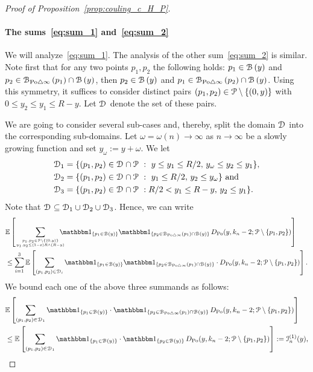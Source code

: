 \begin{proof}[Proof of Proposition~\ref{prop:couling_c_H_P}]
\paragraph{The sums~\eqref{eq:sum_1} and~\eqref{eq:sum_2}}

We will analyze~\eqref{eq:sum_1}. The analysis of the other sum~\eqref{eq:sum_2} is similar.
Note first that for any two points $p_1,p_2$ the following holds: $p_1 \in {\mathcal B}\left(y\right)$ and $p_2 \in {\mathcal B}_{{\mathrm{Po}} \bigtriangleup \infty}\left(p_1\right)\cap {\mathcal B}\left(y\right)$, then $p_2 \in {\mathcal B}\left(y\right)$ and $p_1 \in {\mathcal B}_{{\mathrm{Po}} \bigtriangleup \infty}\left(p_2\right)\cap {\mathcal B}\left(y\right)$.
Using this symmetry, it suffices to consider distinct pairs $(p_1,p_2) \in {\mathcal P} \setminus \{(0,y)\}$ with $0\leq y_2 \leq y_1 \leq R- y$. Let $\mathcal{D}_{}$ denote the set of these pairs. 

We are going to consider several sub-cases and, thereby, split the domain $\mathcal{D}_{}$ into the corresponding sub-domains. 
Let $\omega =\omega (n) \to \infty$ as $n\to \infty$ be a slowly growing function and set $y_\omega := y +\omega$. 
We let 
\begin{align*}
	\mathcal{D}_{1} &= \{(p_1,p_2) \in \mathcal{D}_{} \cap {\mathcal P} \ : \ y \leq y_1 \leq R/2, \, y_\omega \leq y_2 \leq y_1 \},\\
	\mathcal{D}_{2} &= \{(p_1,p_2) \in \mathcal{D}_{} \cap {\mathcal P} \ : \ y_1 \leq R/2, \, y_2 \leq y_\omega \} \text{ and }\\
	\mathcal{D}_{3} &=  \{(p_1,p_2) \in \mathcal{D}_{} \cap {\mathcal P} \ : R/2 < y_1 \leq R -y, \, y_2 \leq y_1 \}.
\end{align*} 
Note that $\mathcal{D}_{} \subseteq \mathcal{D}_{1} \cup \mathcal{D}_{2}\cup \mathcal{D}_{3}$.
Hence, we can write 
\begin{equation} \label{eq:1sum-rewriting}
\begin{split} 
	&\Exp{\sum_{p_1, p_2\in \Pcal \setminus \{(0,y)\} 
	\atop y_1, y_2 \leq (1-\eps) R\wedge (R-y)} \hspace{-10pt} \ind{p_1 \in \BallHyp{y}} 
	\ind{p_2 \in \BallSym{p_1}\cap \BallHyp{y}} 
	\, D_{\Po} (y,k_n-2;\Pcal \setminus \{p_1,p_2\})} \\ 
	&\le \sum_{i=1}^3 \Exp{\sum_{(p_1, p_2)\in \dom{i}} \ind{p_1 \in \BallHyp{y}} 
	\ind{p_2 \in \BallSym{p_1}\cap \BallHyp{y}} \cdot D_{\Po} (y,k_n-2;\Pcal \setminus \{p_1,p_2\})}.
\end{split}
\end{equation}
We bound each one of the above three summands as follows:  
\begin{equation} \label{eq:term1}
\begin{split}
	&\Exp{\sum_{(p_1, p_2)\in \dom{1}} \ind{p_1 \in \BallHyp{y}} \cdot \ind{p_2 \in \BallSym{p_1}\cap \BallHyp{y}} 
		\, D_{\Po} (y,k_n-2;\Pcal \setminus \{p_1,p_2\})} \\
	&\le \Exp{\sum_{(p_1, p_2)\in \dom{1}} \ind{p_1 \in \BallHyp{y}} \cdot \ind{p_2 \in  \BallHyp{y}} 
		\, D_{\Po} (y,k_n-2;\Pcal \setminus \{p_1,p_2\})} := \mathcal{I}_n^{(1)}(y),
\end{split}
\end{equation}


\end{proof}

